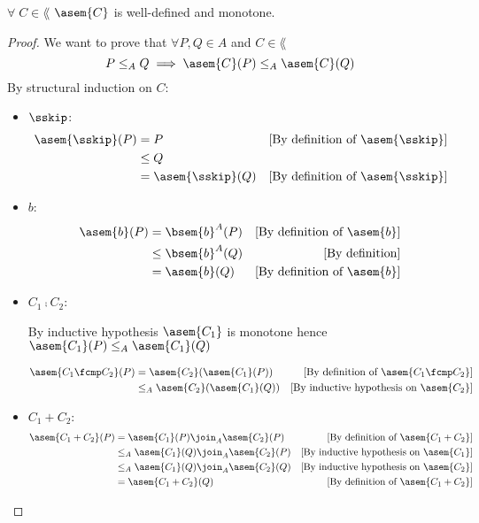 \begin{theorem}[Monotonicity]
  \label{thm:asem-mono} 
  $\forall \; C \in \lang$ $\asem{C}$ is well-defined and monotone.
\end{theorem}
\begin{proof}
  We want to prove that $\forall P, Q \in A$ and $C \in \lang$
  $$P \leq_A Q \implies \asem{C}(P) \leq_A \asem{C}(Q)$$
  By structural induction on $C$:
  \begin{itemize}
    \item $\sskip$:
      \begin{align*}
        \asem{\sskip}(P) 
          &= P 
          & \text{[By definition of $\asem{\sskip}$]}\\
          &\leq Q \\
          &= \asem{\sskip}(Q) 
          & \text{[By definition of $\asem{\sskip}$]}\\
      \end{align*}

    \item $b$:
      \begin{align*}
        \asem{b}(P) 
          &= \bsem{b}^A(P)
          & \text{[By definition of $\asem{b}$]}\\
          &\leq \bsem{b}^A(Q)
          & \text{[By definition]}\\
          &= \asem{b}(Q) 
          & \text{[By definition of $\asem{b}$]}\\
      \end{align*}

    \item $C_1 \fcmp C_2$:

      By inductive hypothesis $\asem{C_1}$ is monotone hence
      $\asem{C_1}(P) \leq_A \asem{C_1}(Q)$

      \begin{align*}
        \asem{C_1 \fcmp C_2}(P) 
          &= \asem{C_2}(\asem{C_1}(P))
          &\text{[By definition of $\asem{C_1 \fcmp C_2}$]}\\
          &\leq_A \asem{C_2}(\asem{C_1}(Q))
          &\text{[By inductive hypothesis on $\asem{C_2}$]} \\
      \end{align*}
  
    \item $C_1 + C_2$:
      \begin{align*}
        \asem{C_1 + C_2}(P) 
          &= \asem{C_1}(P) \join_A \asem{C_2}(P)
          &\text{[By definition of $\asem{C_1 + C_2}$]}\\
          &\leq_A \asem{C_1}(Q) \join_A \asem{C_2}(P)
          &\text{[By inductive hypothesis on $\asem{C_1}$]} \\
          &\leq_A \asem{C_1}(Q) \join_A \asem{C_2}(Q)
          &\text{[By inductive hypothesis on $\asem{C_2}$]} \\
          &= \asem{C_1 + C_2}(Q) 
          &\text{[By definition of $\asem{C_1 + C_2}$]}\\
      \end{align*}
    

\end{itemize}
\end{proof}

